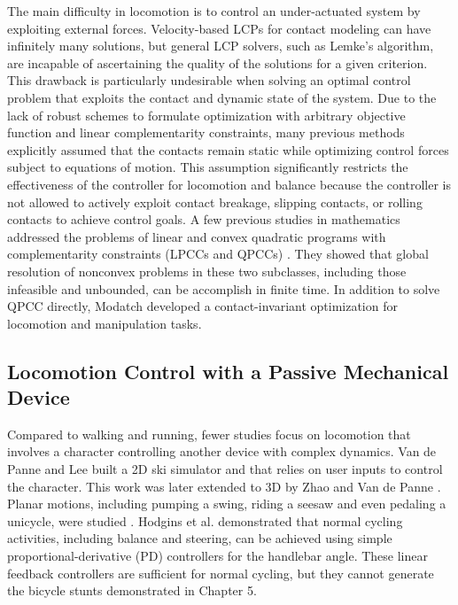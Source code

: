 The main difficulty in
locomotion is to control an under-actuated system by exploiting
external forces. Velocity-based LCPs for contact
modeling can have infinitely many solutions, but general LCP solvers,
such as Lemke's algorithm, are incapable of ascertaining the quality of
the solutions for a given criterion. This drawback is particularly
undesirable when solving an optimal control problem that exploits the
contact and dynamic state of the system. Due to the lack of robust
schemes to formulate optimization with arbitrary objective function
and linear complementarity constraints, many previous methods
explicitly assumed that the contacts remain static
\cite{Abe:2007,Jain:2009,Kim:2011:DCO} while optimizing control forces
subject to equations of motion. This assumption significantly
restricts the effectiveness of the controller for locomotion and balance
because the controller is not allowed to actively exploit contact
breakage, slipping contacts, or rolling contacts to achieve control
goals. A few previous studies in mathematics addressed the problems of
linear and convex quadratic programs with complementarity constraints
(LPCCs and QPCCs) \cite{Hu:2008,Bai:2011}. They showed that global resolution of
nonconvex problems in these two subclasses, including those infeasible
and unbounded, can be accomplish in finite time. In addition to solve QPCC directly, Modatch \cite{Mordatch:2012,Mordatch:2012,Mordatch:2013} developed a contact-invariant optimization for locomotion and manipulation tasks.

\subsection{Locomotion Control with a Passive Mechanical Device} Compared to walking and running, fewer studies focus on locomotion that involves a character controlling another device with complex dynamics. Van de Panne and Lee \cite{vandepanne:2003} built a 2D ski simulator and that relies on user inputs to control the character. This work was later extended to 3D by Zhao and Van de Panne \cite{Zhao:2005}. Planar motions, including pumping a swing, riding a seesaw and even pedaling a unicycle, were studied \cite{Hodgins:1992}. Hodgins et al. \cite{Hodgins:1995:AHA} demonstrated that normal cycling activities, including balance and steering, can be achieved using simple proportional-derivative (PD) controllers for the handlebar angle. These linear feedback controllers are sufficient for normal cycling, but they cannot generate the bicycle stunts demonstrated in Chapter 5.

